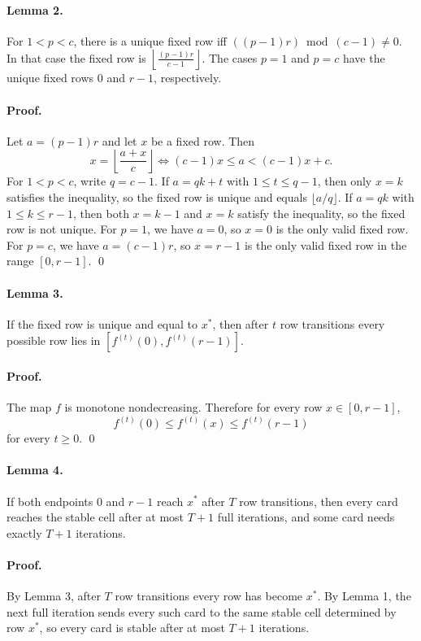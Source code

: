 \documentclass[11pt]{article}
\begin{document}
\paragraph{Lemma 2.}
For $1 < p < c$, there is a unique fixed row iff $((p-1)r) \bmod (c-1) \ne 0$. In that case the fixed row is
$\left\lfloor \frac{(p-1)r}{c-1} \right\rfloor$. The cases $p=1$ and $p=c$ have the unique fixed rows $0$ and
$r-1$, respectively.

\paragraph{Proof.}
Let $a=(p-1)r$ and let $x$ be a fixed row. Then
\[
    x=\left\lfloor \frac{a+x}{c}\right\rfloor
    \iff (c-1)x \le a < (c-1)x + c.
\]
For $1<p<c$, write $q=c-1$. If $a=qk+t$ with $1 \le t \le q-1$, then only $x=k$ satisfies the inequality,
so the fixed row is unique and equals $\lfloor a/q \rfloor$.
If $a=qk$ with $1 \le k \le r-1$, then both $x=k-1$ and $x=k$ satisfy the inequality, so the fixed row is
not unique.
For $p=1$, we have $a=0$, so $x=0$ is the only valid fixed row. For $p=c$, we have $a=(c-1)r$, so
$x=r-1$ is the only valid fixed row in the range $[0,r-1]$. \qed

\paragraph{Lemma 3.}
If the fixed row is unique and equal to $x^*$, then after $t$ row transitions every possible row lies in
$[f^{(t)}(0), f^{(t)}(r-1)]$.

\paragraph{Proof.}
The map $f$ is monotone nondecreasing. Therefore for every row $x \in [0,r-1]$,
\[
    f^{(t)}(0) \le f^{(t)}(x) \le f^{(t)}(r-1)
\]
for every $t \ge 0$. \qed

\paragraph{Lemma 4.}
If both endpoints $0$ and $r-1$ reach $x^*$ after $T$ row transitions, then every card reaches the stable
cell after at most $T+1$ full iterations, and some card needs exactly $T+1$ iterations.

\paragraph{Proof.}
By Lemma 3, after $T$ row transitions every row has become $x^*$. By Lemma 1, the next full iteration
sends every such card to the same stable cell determined by row $x^*$, so every card is stable after at
most $T+1$ iterations.
\end{document}

